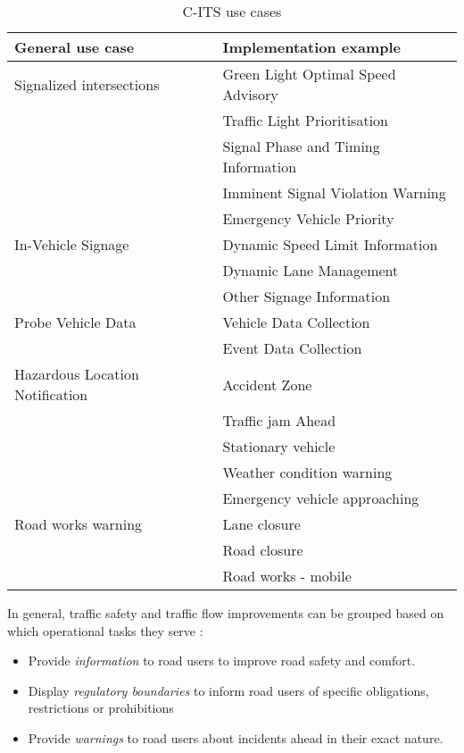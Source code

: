 \documentclass[0main.tex]{subfiles}
\begin{document}
\begin{table}[htbp]
    \centering\begin{tabular}{ll}
        \toprule
        \textbf{General use case} & \textbf{Implementation example} \\ \midrule
        Signalized intersections & Green Light Optimal Speed Advisory \\ 
        & Traffic Light Prioritisation \\
        & Signal Phase and Timing Information \\
        & Imminent Signal Violation Warning \\ 
        & Emergency Vehicle Priority \\ \midrule
        In-Vehicle Signage & Dynamic Speed Limit Information \\ 
        & Dynamic Lane Management \\ 
        & Other Signage Information \\ 
        \midrule
        Probe Vehicle Data & Vehicle Data Collection \\ 
        & Event Data Collection \\ 
        \midrule
        Hazardous Location Notification & Accident Zone \\ 
        & Traffic jam Ahead \\ 
        & Stationary vehicle\\ 
        & Weather condition warning \\ 
        & Emergency vehicle approaching \\ 
        \midrule
        Road works warning & Lane closure \\ 
        & Road closure \\ 
        & Road works - mobile \\ \bottomrule
    \end{tabular}
    \caption{C-ITS use cases \cite{2022}}
    \label{c-its-use-case}
\end{table}


In general, traffic safety and traffic flow improvements can be grouped based on which 
operational tasks they serve \cite{CRoads2021}: 

\begin{itemize}
    \item Provide \emph{information} to road users to improve road safety and comfort.
    \item Display \emph{regulatory boundaries} to inform road users of specific obligations, 
    restrictions or prohibitions
    \item Provide \emph{warnings} to road users about incidents ahead in their exact nature. 
\end{itemize}
\end{document}
